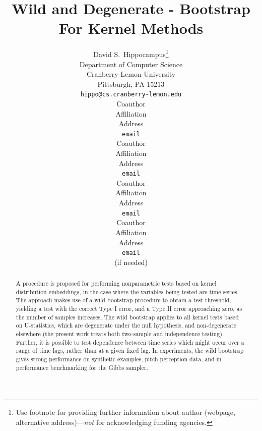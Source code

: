 \documentclass{article} %
\title{Wild and Degenerate - Bootstrap For Kernel Methods}
\author{
David S.~Hippocampus\thanks{ Use footnote for providing further information
about author (webpage, alternative address)---\emph{not} for acknowledging
funding agencies.} \\
Department of Computer Science\\
Cranberry-Lemon University\\
Pittsburgh, PA 15213 \\
\texttt{hippo@cs.cranberry-lemon.edu} \\
\And
Coauthor \\
Affiliation \\
Address \\
\texttt{email} \\
\AND
Coauthor \\
Affiliation \\
Address \\
\texttt{email} \\
\And
Coauthor \\
Affiliation \\
Address \\
\texttt{email} \\
\And
Coauthor \\
Affiliation \\
Address \\
\texttt{email} \\
(if needed)\\
}
\begin{document}
\maketitle

\begin{abstract}

A procedure is proposed for performing nonparametric tests
based on kernel distribution embeddings, in the case where the variables
being tested are time series. The approach makes use of a wild
bootstrap procedure to obtain a test threshold, yielding
a test with the correct Type I error, and a Type II error approaching 
zero, as the number of samples increases.  The wild bootstrap 
 applies to all kernel tests based on U-statistics, which
are degenerate under the null hypothesis, and non-degenerate elsewhere 
(the present work treats both two-sample and independence testing).
Further, it is possible to test dependence between time series which might
occur  over a range of time lags, rather than at a given fixed lag.
In experiments, the wild bootstrap gives strong performance
on synthetic examples, pitch perception data, 
and in  performance benchmarking for the Gibbs sampler.
\end{abstract}


\end{document}
